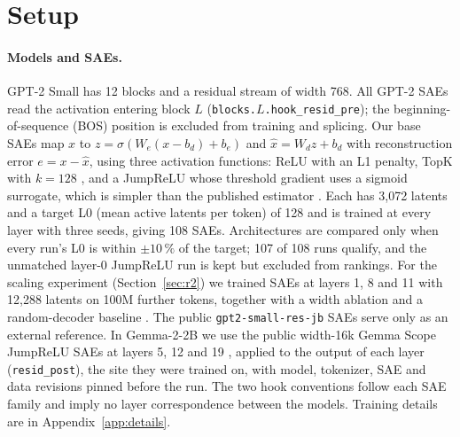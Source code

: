 \section{Setup}\label{sec:setup}



\paragraph{Models and SAEs.} GPT-2 Small has 12 blocks and a residual stream of width 768. All GPT-2 SAEs read the
activation entering block $L$ (\texttt{blocks.$L$.hook\_resid\_pre}); the beginning-of-sequence (BOS) position is
excluded from training and splicing. Our base SAEs map $x$ to $z=\sigma(W_e(x-b_d)+b_e)$ and $\hat{x}=W_dz+b_d$ with
reconstruction error $e=x-\hat{x}$, using three activation functions: ReLU with an L1 penalty, TopK with $k=128$
\citep{gao2024scaling}, and a JumpReLU whose threshold gradient uses a sigmoid surrogate, which is simpler than the
published estimator \citep{rajamanoharan2024jumping}. Each has 3{,}072 latents and a target L0 (mean active latents per
token) of 128 and is trained at every layer with three seeds, giving 108 SAEs. Architectures are compared only when
every run's L0 is within $\pm10\,\%$ of the target; 107 of 108 runs qualify, and the unmatched layer-0 JumpReLU run is
kept but excluded from rankings. For the scaling experiment (Section~\ref{sec:r2}) we trained SAEs at layers 1, 8 and
11 with 12{,}288 latents on 100M further tokens, together with a width ablation and a random-decoder baseline
\citep{korznikov2026random}. The public \texttt{gpt2-small-res-jb} SAEs \citep{bloom2024gpt2} serve only as an external
reference. In Gemma-2-2B we use the public width-16k Gemma Scope JumpReLU SAEs at layers 5, 12 and 19
\citep{gemmascope2024}, applied to the output of each layer (\texttt{resid\_post}), the site they were trained on, with
model, tokenizer, SAE and data revisions pinned before the run. The two hook conventions follow each SAE family and
imply no layer correspondence between the models. Training details are in Appendix~\ref{app:details}.

